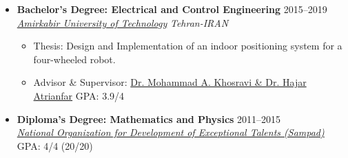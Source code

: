 \documentclass[11pt,a4paper,sans]{moderncv} %
\begin{document}
\begin{itemize}
  \vspace{1em}
		\item \textbf{Bachelor's Degree: Electrical and Control Engineering} \hfill 2015--2019 \\
		\href{https://aut.ac.ir/en}{ \emph{Amirkabir University of Technology}} \hfill \emph{Tehran-IRAN}
		
		\begin{itemize}
   \item Thesis: Design and Implementation of an indoor positioning system for a four-wheeled robot.
   \item {Advisor \& Supervisor: \href{https://aut.ac.ir/cv/2273/MohammadAzam-Khosravi?slc_lang=en&&cv=2273&mod=scv}{Dr. Mohammad A. Khosravi \& Dr. Hajar Atrianfar}} \hspace{10 pt}  \hspace{10 pt}  \hfill  GPA: 3.9/4
		\end{itemize}
   \vspace{1em}
		\item \textbf{Diploma's Degree: Mathematics and Physics} \hfill 2011--2015 \\
		\href{https://en.wikipedia.org/wiki/National_Organization_for_Development_of_Exceptional_Talents}{ \emph{National Organization for Development of Exceptional Talents (Sampad)}} \hfill GPA: 4/4 (20/20)
		
	\end{itemize}
	
\end{document}
